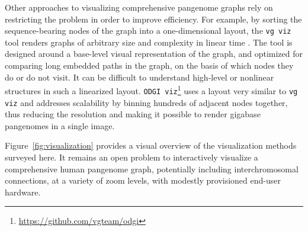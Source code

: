 Other approaches to visualizing comprehensive pangenome graphs rely on restricting the problem in order to improve efficiency.
For example, by sorting the sequence-bearing nodes of the graph into a one-dimensional layout, the \texttt{vg viz} tool renders graphs of arbitrary size and complexity in linear time \citep{Garrison_2019}. 
The tool is designed around a base-level visual representation of the graph, and optimized for comparing long embedded paths in the graph, on the basis of which nodes they do or do not visit. 
It can be difficult to understand high-level or nonlinear structures in such a linearized layout. 
\texttt{ODGI viz}\footnote{\url{https://github.com/vgteam/odgi}} uses a layout very similar to \texttt{vg viz} and addresses scalability by binning hundreds of adjacent nodes together, thus reducing the resolution and making it possible to render gigabase pangenomes in a single image.

Figure~\ref{fig:visualization} provides a visual overview of the visualization methods surveyed here.
It remains an open problem to interactively visualize a comprehensive human pangenome graph, potentially including interchromosomal connections, at a variety of zoom levels, with modestly provisioned end-user hardware.

